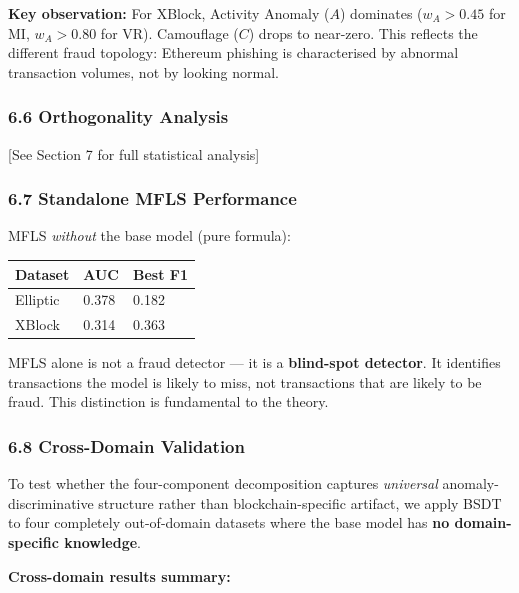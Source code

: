 \documentclass[
  11pt,
]{article}
\newcounter{none} %
\begin{document}
\textbf{Key observation:} For XBlock, Activity Anomaly (\(A\)) dominates
(\(w_A > 0.45\) for MI, \(w_A > 0.80\) for VR). Camouflage (\(C\)) drops
to near-zero. This reflects the different fraud topology: Ethereum
phishing is characterised by abnormal transaction volumes, not by
looking normal.

\subsubsection{6.6 Orthogonality Analysis}\label{orthogonality-analysis}

{[}See Section 7 for full statistical analysis{]}

\subsubsection{6.7 Standalone MFLS
Performance}\label{standalone-mfls-performance}

MFLS \emph{without} the base model (pure formula):

{\def\LTcaptype{none} %
\begin{longtable}[]{@{}lll@{}}
\toprule\noalign{}
Dataset & AUC & Best F1 \\
\midrule\noalign{}
\endhead
\bottomrule\noalign{}
\endlastfoot
Elliptic & 0.378 & 0.182 \\
XBlock & 0.314 & 0.363 \\
\end{longtable}
}

MFLS alone is not a fraud detector — it is a \textbf{blind-spot
detector}. It identifies transactions the model is likely to miss, not
transactions that are likely to be fraud. This distinction is
fundamental to the theory.

\subsubsection{6.8 Cross-Domain
Validation}\label{cross-domain-validation}

To test whether the four-component decomposition captures
\emph{universal} anomaly-discriminative structure rather than
blockchain-specific artifact, we apply BSDT to four completely
out-of-domain datasets where the base model has \textbf{no
domain-specific knowledge}.

\textbf{Cross-domain results summary:}
\end{document}
